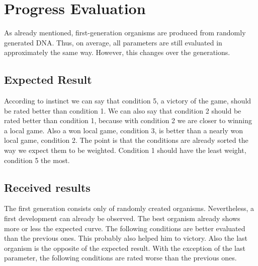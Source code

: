 \section{Progress Evaluation}
As already mentioned, first-generation organisms are produced from randomly generated DNA. Thus, on average, all parameters are still evaluated in approximately the same way. However, this changes over the generations.

\subsection{Expected Result}
According to instinct we can say that condition 5, a victory of the game, should be rated better than condition 1. We can also say that condition 2 should be rated better than condition 1, because with condition 2 we are closer to winning a local game. Also a won local game, condition 3, is better than a nearly won local game, condition 2.
The point is that the conditions are already sorted the way we expect them to be weighted. Condition 1 should have the least weight, condition 5 the most.

\subsection{Received results}
The first generation consists only of randomly created organisms. Nevertheless, a first development can already be observed. The best organism already shows more or less the expected curve. The following conditions are better evaluated than the previous ones. This probably also helped him to victory. Also the last organism is the opposite of the expected result. With the exception of the last parameter, the following conditions are rated worse than the previous ones.\\

